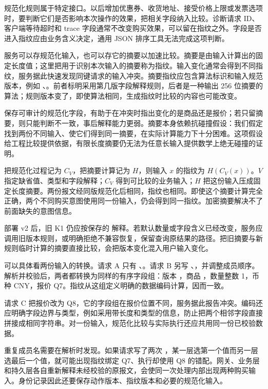 规范化规则属于特定接口。以后增加优惠券、收货地址、接受价格上限或发票选项时，要判断它们是否影响本次操作的效果，把相关字段纳入比较。诊断请求 ID、客户端等待超时和 trace 字段通常不改变购买效果，可以留在指纹之外。字段是否进入指纹应由业务含义决定，通用 JSON 排序工具无法完成这项判断。

服务可以存规范化输入，也可以存它的摘要以加速比较。摘要是由输入计算出的固定长度值；这里把用于识别本次输入的摘要称为指纹。输入变化通常会得到不同指纹，服务据此快速发现同键请求的输入冲突。摘要指纹应包含算法标识和输入规范版本，例如 、\mbox{}。前者标明采用第几版字段解释规则，后者是一种输出 256 位摘要的算法；规则版本变了，即使算法相同，生成指纹时比较的内容也可能改变。

保存可审计的规范化字段，有助于在冲突时指出变化的是商品还是报价；若只留摘要，则只能判断不一致，事后解释能力更弱。摘要本身依赖抗碰撞假设：我们假定找到两份不同输入、使它们得到同一摘要，在实际计算能力下十分困难。这项假设给工程比较提供依据，有限长度摘要仍无法为任意长输入提供数学上绝无碰撞的证明。

把规范化过程记为 \(C_V\)，把摘要计算记为 \(H\)，则输入 \(x\) 的指纹为 \(H(C_V(x))\)。\(V\) 指定缺省值、类型和字段解释；\(C_V\) 得到可比较的业务输入；\(H\) 把这份输入压成固定长度摘要。两份报文经同版规范化后相同，指纹也相同。即使这个摘要计算完全正确，两个不同购买意图使用同一份输入，仍会得到同一指纹。加密摘要解决不了前面缺失的意图信息。



部署 v2 后，旧 K1 仍应按保存的  解释。若默认数量或字段含义已经改变，服务应调用旧版本规则，或明确拒绝不兼容恢复，保留查询原结果的路径。把旧摘要与新规则临时计算的摘要直接比较，会把版本变化混入用户输入变化。

可以具体看两份输入的转换。请求 A 只有 、。请求 B 另写 、，并调整成员顺序。解析并校验后，两者都转换为同样的有序字段组：版本 ，商品 ，数量整数 1，币种 CNY，报价 Q7。指纹从这组定义明确的数据编码计算，因而一致。

请求 C 把报价改为 Q8，它的字段组在报价位置不同，服务据此报告冲突。编码还应明确字段边界与类型，例如采用带长度和类型的信息，防止把两个相邻字段直接拼接成相同字符串。对一份输入，规范化比较与实际执行还应共用同一份已校验数据。

重复成员名需要在解析时发现。如果请求写了两次 ，某一层选第一个值而另一层选最后一个值，就可能出现指纹绑定 Q7、执行却使用 Q8 的错配。网关、业务层和持久层各自重新解释未经校验的原报文，会使同一次处理内部出现两种购买输入。身份记录因此还要保存动作版本、指纹版本和必要的规范化输入。

